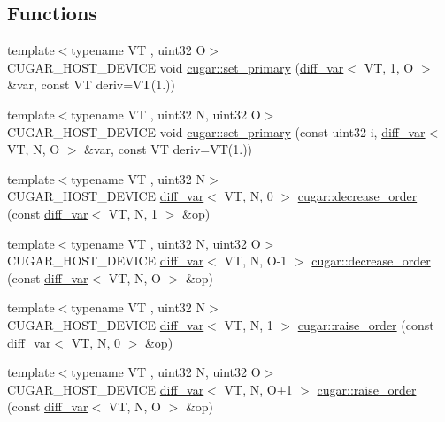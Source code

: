 \subsection*{Functions}
\begin{DoxyCompactItemize}
\item 
{\footnotesize template$<$typename VT , uint32 O$>$ }\\C\+U\+G\+A\+R\+\_\+\+H\+O\+S\+T\+\_\+\+D\+E\+V\+I\+CE void \hyperlink{group___auto_diff_module_gae283602ee3cc33d77e33a2ccdb65e36d}{cugar\+::set\+\_\+primary} (\hyperlink{structcugar_1_1diff__var}{diff\+\_\+var}$<$ VT, 1, O $>$ \&var, const VT deriv=VT(1.))
\item 
{\footnotesize template$<$typename VT , uint32 N, uint32 O$>$ }\\C\+U\+G\+A\+R\+\_\+\+H\+O\+S\+T\+\_\+\+D\+E\+V\+I\+CE void \hyperlink{group___auto_diff_module_gaa768e489a1703901c058e46e319f2d3e}{cugar\+::set\+\_\+primary} (const uint32 i, \hyperlink{structcugar_1_1diff__var}{diff\+\_\+var}$<$ VT, N, O $>$ \&var, const VT deriv=VT(1.))
\item 
{\footnotesize template$<$typename VT , uint32 N$>$ }\\C\+U\+G\+A\+R\+\_\+\+H\+O\+S\+T\+\_\+\+D\+E\+V\+I\+CE \hyperlink{structcugar_1_1diff__var}{diff\+\_\+var}$<$ VT, N, 0 $>$ \hyperlink{group___auto_diff_module_ga4a6a026da6c1dfcc17b9b10140883334}{cugar\+::decrease\+\_\+order} (const \hyperlink{structcugar_1_1diff__var}{diff\+\_\+var}$<$ VT, N, 1 $>$ \&op)
\item 
{\footnotesize template$<$typename VT , uint32 N, uint32 O$>$ }\\C\+U\+G\+A\+R\+\_\+\+H\+O\+S\+T\+\_\+\+D\+E\+V\+I\+CE \hyperlink{structcugar_1_1diff__var}{diff\+\_\+var}$<$ VT, N, O-\/1 $>$ \hyperlink{group___auto_diff_module_ga1ecca883effa0157aba03a1cb7d7d1e9}{cugar\+::decrease\+\_\+order} (const \hyperlink{structcugar_1_1diff__var}{diff\+\_\+var}$<$ VT, N, O $>$ \&op)
\item 
{\footnotesize template$<$typename VT , uint32 N$>$ }\\C\+U\+G\+A\+R\+\_\+\+H\+O\+S\+T\+\_\+\+D\+E\+V\+I\+CE \hyperlink{structcugar_1_1diff__var}{diff\+\_\+var}$<$ VT, N, 1 $>$ \hyperlink{group___auto_diff_module_gadb5d2fdd94aac834a5eabdd1a8497be2}{cugar\+::raise\+\_\+order} (const \hyperlink{structcugar_1_1diff__var}{diff\+\_\+var}$<$ VT, N, 0 $>$ \&op)
\item 
{\footnotesize template$<$typename VT , uint32 N, uint32 O$>$ }\\C\+U\+G\+A\+R\+\_\+\+H\+O\+S\+T\+\_\+\+D\+E\+V\+I\+CE \hyperlink{structcugar_1_1diff__var}{diff\+\_\+var}$<$ VT, N, O+1 $>$ \hyperlink{group___auto_diff_module_ga72857305c1e63bb7b253731201a98d00}{cugar\+::raise\+\_\+order} (const \hyperlink{structcugar_1_1diff__var}{diff\+\_\+var}$<$ VT, N, O $>$ \&op)

\end{DoxyCompactItemize}
